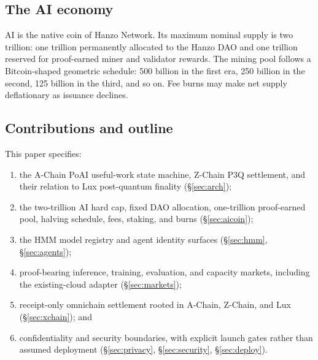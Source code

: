 \subsection{The AI economy}

AI is the native coin of Hanzo Network. Its maximum nominal supply is two
trillion: one trillion permanently allocated to the Hanzo DAO and one trillion
reserved for proof-earned miner and validator rewards. The mining pool follows a
Bitcoin-shaped geometric schedule: 500 billion in the first era, 250 billion in
the second, 125 billion in the third, and so on. Fee burns may make net supply
deflationary as issuance declines.

\subsection{Contributions and outline}

This paper specifies:

\begin{enumerate}[leftmargin=1.4em]
  \item the A-Chain PoAI useful-work state machine, Z-Chain P3Q settlement, and
        their relation to Lux post-quantum finality (\S\ref{sec:arch});
  \item the two-trillion AI hard cap, fixed DAO allocation, one-trillion
        proof-earned pool, halving schedule, fees, staking, and burns
        (\S\ref{sec:aicoin});
  \item the HMM model registry and agent identity surfaces
        (\S\ref{sec:hmm}, \S\ref{sec:agents});
  \item proof-bearing inference, training, evaluation, and capacity markets,
        including the existing-cloud adapter (\S\ref{sec:markets});
  \item receipt-only omnichain settlement rooted in A-Chain, Z-Chain, and Lux
        (\S\ref{sec:xchain}); and
  \item confidentiality and security boundaries, with explicit launch gates
        rather than assumed deployment (\S\ref{sec:privacy},
        \S\ref{sec:security}, \S\ref{sec:deploy}).
\end{enumerate}
